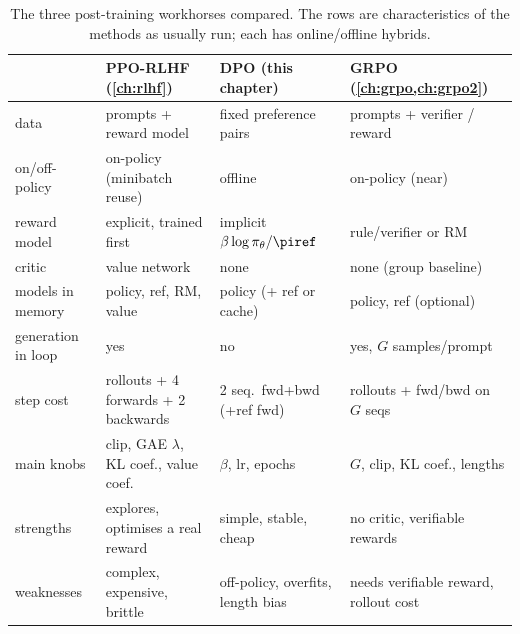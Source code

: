 \begin{table}[t]
\centering\small
\begin{tabularx}{\linewidth}{@{}lXXX@{}}
\toprule
 & \textbf{PPO-RLHF} (\cref{ch:rlhf}) & \textbf{DPO} (this chapter) & \textbf{GRPO} (\cref{ch:grpo,ch:grpo2})\\
\midrule
data & prompts + reward model & fixed preference pairs & prompts + verifier / reward\\
on/off-policy & on-policy (minibatch reuse) & offline & on-policy (near)\\
reward model & explicit, trained first & implicit $\beta\log\pi_\theta/\piref$ & rule/verifier or RM\\
critic & value network & none & none (group baseline)\\
models in memory & policy, ref, RM, value & policy (+ ref or cache) & policy, ref (optional)\\
generation in loop & yes & no & yes, $G$ samples/prompt\\
step cost & rollouts + 4 forwards + 2 backwards & 2 seq.\ fwd+bwd (+ref fwd) & rollouts + fwd/bwd on $G$ seqs\\
main knobs & clip, GAE $\lambda$, KL coef., value coef. & $\beta$, lr, epochs & $G$, clip, KL coef., lengths\\
strengths & explores, optimises a real reward & simple, stable, cheap & no critic, verifiable rewards\\
weaknesses & complex, expensive, brittle & off-policy, overfits, length bias & needs verifiable reward, rollout cost\\
\bottomrule
\end{tabularx}
\caption{The three post-training workhorses compared. The rows are characteristics of the
methods as usually run; each has online/offline hybrids.}
\label{tab:dpo:compare}
\end{table}

